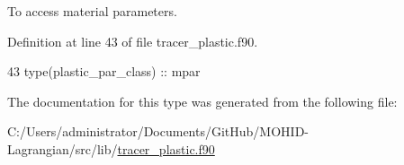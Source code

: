 To access material parameters. 



Definition at line 43 of file tracer\+\_\+plastic.\+f90.


\begin{DoxyCode}
43         \textcolor{keywordtype}{type}(plastic\_par\_class)   :: mpar
\end{DoxyCode}


The documentation for this type was generated from the following file\+:\begin{DoxyCompactItemize}
\item 
C\+:/\+Users/administrator/\+Documents/\+Git\+Hub/\+M\+O\+H\+I\+D-\/\+Lagrangian/src/lib/\mbox{\hyperlink{tracer__plastic_8f90}{tracer\+\_\+plastic.\+f90}}\end{DoxyCompactItemize}
